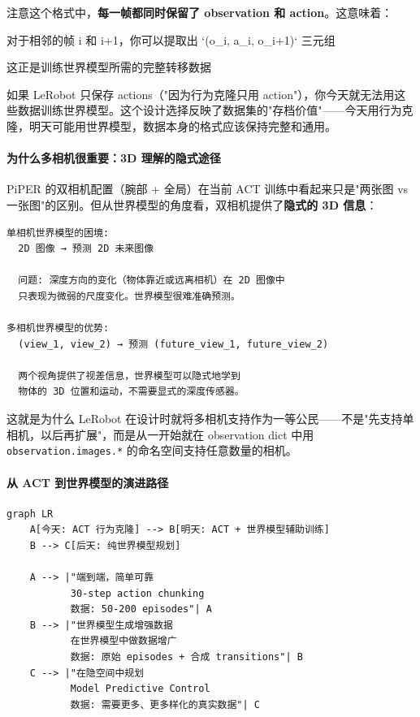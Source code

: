 \documentclass[UTF8,a4paper,11pt]{ctexart}
\begin{document}
注意这个格式中，\textbf{每一帧都同时保留了 observation 和 action}。这意味着：
\item 对于相邻的帧 i 和 i+1，你可以提取出 `(o_i, a_i, o_{i+1})` 三元组
\item 这正是训练世界模型所需的完整转移数据

如果 LeRobot 只保存 actions（"因为行为克隆只用 action"），你今天就无法用这些数据训练世界模型。这个设计选择反映了数据集的"存档价值"——今天用行为克隆，明天可能用世界模型，数据本身的格式应该保持完整和通用。

\paragraph{为什么多相机很重要：3D 理解的隐式途径}


PiPER 的双相机配置（腕部 + 全局）在当前 ACT 训练中看起来只是"两张图 vs 一张图"的区别。但从世界模型的角度看，双相机提供了\textbf{隐式的 3D 信息}：

\begin{lstlisting}[language=text]
单相机世界模型的困境:
  2D 图像 → 预测 2D 未来图像
  
  问题: 深度方向的变化（物体靠近或远离相机）在 2D 图像中
  只表现为微弱的尺度变化。世界模型很难准确预测。

多相机世界模型的优势:
  (view_1, view_2) → 预测 (future_view_1, future_view_2)
  
  两个视角提供了视差信息，世界模型可以隐式地学到
  物体的 3D 位置和运动，不需要显式的深度传感器。
\end{lstlisting}

这就是为什么 LeRobot 在设计时就将多相机支持作为一等公民——不是"先支持单相机，以后再扩展"，而是从一开始就在 observation dict 中用 \texttt{observation.images.*} 的命名空间支持任意数量的相机。

\paragraph{从 ACT 到世界模型的演进路径}


\begin{lstlisting}[language=mermaid]
graph LR
    A[今天: ACT 行为克隆] --> B[明天: ACT + 世界模型辅助训练]
    B --> C[后天: 纯世界模型规划]
    
    A --> |"端到端，简单可靠
           30-step action chunking
           数据: 50-200 episodes"| A
    B --> |"世界模型生成增强数据
           在世界模型中做数据增广
           数据: 原始 episodes + 合成 transitions"| B
    C --> |"在隐空间中规划
           Model Predictive Control
           数据: 需要更多、更多样化的真实数据"| C
\end{lstlisting}
\end{document}
